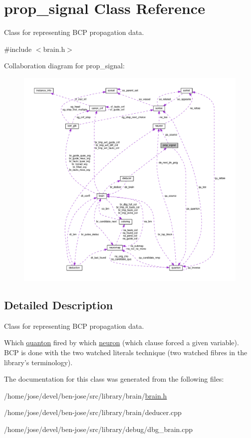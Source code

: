 \hypertarget{classprop__signal}{\section{prop\+\_\+signal Class Reference}
\label{classprop__signal}
}


Class for representing B\+C\+P propagation data.  




{\ttfamily \#include $<$brain.\+h$>$}



Collaboration diagram for prop\+\_\+signal\+:\nopagebreak
\begin{figure}[H]
\begin{center}
\leavevmode
\includegraphics[width=350pt]{da/d8d/classprop__signal__coll__graph}
\end{center}
\end{figure}


\subsection{Detailed Description}
Class for representing B\+C\+P propagation data. 

Which \hyperlink{classquanton}{quanton} fired by which \hyperlink{classneuron}{neuron} (which clause forced a given variable). B\+C\+P is done with the two watched literals technique (two watched fibres in the library's terminology). 

The documentation for this class was generated from the following files\+:\begin{DoxyCompactItemize}
\item 
/home/jose/devel/ben-\/jose/src/library/brain/\hyperlink{brain_8h}{brain.\+h}\item 
/home/jose/devel/ben-\/jose/src/library/brain/deducer.\+cpp\item 
/home/jose/devel/ben-\/jose/src/library/debug/dbg\+\_\+brain.\+cpp\end{DoxyCompactItemize}
